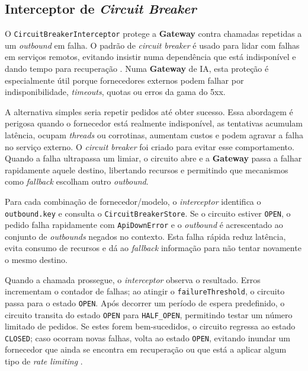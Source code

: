     \subsection{Interceptor de \textit{Circuit Breaker}}
    O \texttt{CircuitBreakerInterceptor} protege a \textbf{Gateway} contra chamadas repetidas a um \textit{outbound} em falha. O padrão de \textit{circuit breaker} é usado para lidar com falhas em serviços remotos, evitando insistir numa dependência que está indisponível e dando tempo para recuperação \cite{microsoft_circuit_breaker,itau_circuit_breaker,treinaweb_circuit_breaker}. Numa \textbf{Gateway} de IA, esta proteção é especialmente útil porque fornecedores externos podem falhar por indisponibilidade, \textit{timeouts}, quotas ou erros da gama do 5xx.

    A alternativa simples seria repetir pedidos até obter sucesso. Essa abordagem é perigosa quando o fornecedor está realmente indisponível, as tentativas acumulam latência, ocupam \textit{threads} ou corrotinas, aumentam custos e podem agravar a falha no serviço externo. O \textit{circuit breaker} foi criado para evitar esse comportamento. Quando a falha ultrapassa um limiar, o circuito abre e a \textbf{Gateway} passa a falhar rapidamente aquele destino, libertando recursos e permitindo que mecanismos como \textit{fallback} escolham outro \textit{outbound}.

    Para cada combinação de fornecedor/modelo, o \textit{interceptor} identifica o \texttt{outbound.key} e consulta o \texttt{CircuitBreakerStore}. Se o circuito estiver \texttt{OPEN}, o pedido falha rapidamente com \texttt{ApiDownError} e o \textit{outbound} é acrescentado ao conjunto de \textit{outbounds} negados no contexto. Esta falha rápida reduz latência, evita consumo de recursos e dá ao \textit{fallback} informação para não tentar novamente o mesmo destino.

    Quando a chamada prossegue, o \textit{interceptor} observa o resultado. Erros incrementam o contador de falhas; ao atingir o \texttt{failureThreshold}, o circuito passa para o estado \texttt{OPEN}. Após decorrer um período de espera predefinido, o circuito transita do estado \texttt{OPEN} para \texttt{HALF\_OPEN}, permitindo testar um número limitado de pedidos. Se estes forem bem-sucedidos, o circuito regressa ao estado \texttt{CLOSED}; caso ocorram novas falhas, volta ao estado \texttt{OPEN}, evitando inundar um fornecedor que ainda se encontra em recuperação ou que está a aplicar algum tipo de \textit{rate limiting} \cite{microsoft_circuit_breaker}.

